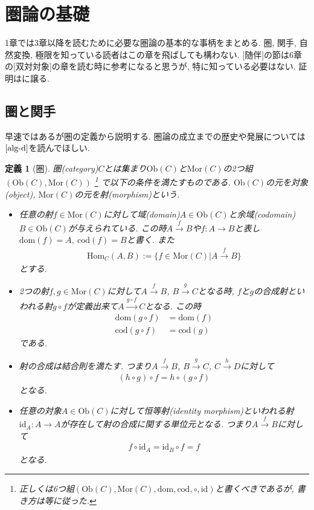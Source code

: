 \documentclass[a4paper,12pt]{ltjsarticle}
\theoremstyle{break}
\newtheorem{defn}[thm]{定義}
\newcommand{\Ob}{\mathrm{Ob}}
\newcommand{\Mor}{\mathrm{Mor}}
\newcommand{\Hom}{\mathrm{Hom}}
\newcommand{\xr}[1]{\xrightarrow{#1}}
\newcommand{\dom}{\mathrm{dom}}
\newcommand{\cod}{\mathrm{cod}}
\newcommand{\id}{\mathrm{id}}
\numberwithin{equation}{section}
\begin{document}
\newpage

\tableofcontents

\newpage

\section{圏論の基礎}

1章では3章以降を読むために必要な圏論の基本的な事柄をまとめる. 
圏, 関手, 自然変換, 極限を知っている読者はこの章を飛ばしても構わない. 
[随伴]の節は6章の[双対対象]の章を読む時に参考になると思うが, 特に知っている必要はない. 
証明は\cite{alg-d}に譲る. 

\subsection{圏と関手}

早速ではあるが圏の定義から説明する. 
圏論の成立までの歴史や発展については$\cite{alg-d}$を読んでほしい.

\begin{defn}[圏]
  圏(category)$C$とは集まり$\Ob(C)$と$\Mor(C)$の2つ組$(\Ob(C),\Mor(C))$
  \footnote{
    正しくは6つ組$(\Ob(C),\Mor(C),\dom,\cod,\circ,\id)$と書くべきであるが, 書き方は\cite{alg-d}等に従った. 
  }
  で以下の条件を満たすものである. 
  $\Ob(C)$の元を対象(object), $\Mor(C)$の元を射(morphism)という. 
  \begin{itemize}
    \item 任意の射$f \in \Mor(C)$に対して域(domain)$A \in \Ob(C)$と余域(codomain)$B \in \Ob(C)$が与えられている. 
    この時$A \xr{f} B$や$f: A \to B$と表し$\dom(f)=A, ~\cod(f)=B$と書く. 
    また
    \begin{align*}
      \Hom_C(A,B) := \{f \in \Mor(C) | A \xr{f} B \}
    \end{align*}
    とする. 
    \item 2つの射$f, g \in \Mor(C)$に対して$A \xr{f} B$, $B \xr{g} C$となる時, $f$と$g$の合成射といわれる射$g \circ f$が定義出来て$A \xr{g \circ f} C$となる. 
    この時
    \begin{align*}
      \dom(g \circ f) &= \dom(f) \\
      \cod(g \circ f) &= \cod(g)
    \end{align*}
    である. 
    \item 射の合成は結合則を満たす. 
    つまり$A \xr{f} B$, $B \xr{g} C$, $C \xr{h} D$に対して
    \begin{align*}
      (h \circ g) \circ f = h \circ (g \circ f)
    \end{align*}
    となる. 
    \item 任意の対象$A \in \Ob(C)$に対して恒等射(identity morphism)といわれる射$\id_A: A \to A$が存在して射の合成に関する単位元となる. 
    つまり$A \xr{f} B$に対して
    \begin{align*}
      f \circ \id_A = \id_B \circ f = f
    \end{align*}
    となる. 
  \end{itemize}
\end{defn}
\end{document}
